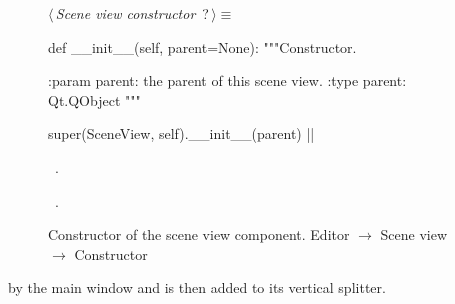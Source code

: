 \documentclass[%
    a4paper,    %
    justified,  %
    nobib,      %
    openany     %
]{tufte-book}
\makeatletter
\renewcommand{\label}[1]{\@tufte@label{##1}}%
\makeatother
\begin{document}
\begin{figure}
\begin{flushleft} \small
\begin{minipage}{\linewidth}\label{scrap82}\raggedright\small
{} $\langle\,${\itshape Scene view constructor}\nobreak\ {\footnotesize {?}}$\,\rangle\equiv$
\vspace{-1ex}
\begin{pythoncode}
def __init__(self, parent=None):
    """Constructor.

    :param parent: the parent of this scene view.
    :type parent: Qt.QObject
    """

    super(SceneView, self).__init__(parent)
|\NWsep|
\end{pythoncode}
\vspace{1.5ex}
\footnotesize
\begin{list}{}{\setlength{\itemsep}{-\parsep}\setlength{\itemindent}{-\leftmargin}}
\item \NWtxtMacroDefBy\ .
\item \NWtxtMacroRefIn\ .

\item{}
\end{list}
\end{minipage}\vspace{4ex}
\end{flushleft}
\caption{Constructor of the scene view component.
  \newline{}\newline{}Editor $\rightarrow$ Scene view $\rightarrow$ Constructor}
\label{editor:lst:scene-view:constructor}
\end{figure}

 by the main window and is then added to its
vertical splitter.
\end{document}
